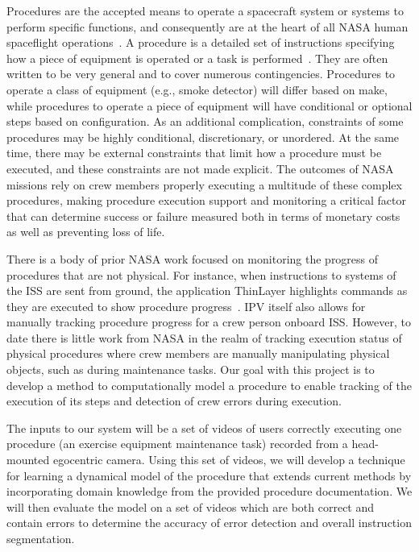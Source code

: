 \documentclass[10pt,letterpaper]{article}
\begin{document}
Procedures are the accepted means to operate a spacecraft system or systems to perform specific functions, and consequently are at the heart of all NASA human spaceflight operations~\cite{kortenkamp2008procedure}. A procedure is a detailed set of instructions specifying how a piece of equipment is operated or a task is performed~\cite{frank2010plans}. They are often written to be very general and to cover numerous contingencies. Procedures to operate a class of equipment (e.g., smoke detector) will differ based on make, while procedures to operate a piece of equipment will have conditional or optional steps based on configuration. As an additional complication, constraints of some procedures may be highly conditional, discretionary, or unordered. At the same time, there may be external constraints that limit how a procedure must be executed, and these constraints are not made explicit. The outcomes of NASA missions rely on crew members properly executing a multitude of these complex procedures, making procedure execution support and monitoring a critical factor that can determine success or failure measured both in terms of monetary costs as well as preventing loss of life.

There is a body of prior NASA work focused on monitoring the progress of procedures that are not physical. For instance, when instructions to systems of the ISS are sent from ground, the application ThinLayer highlights commands as they are executed to show procedure progress~\cite{frank2010plans}. IPV itself also allows for manually tracking procedure progress for a crew person onboard ISS. However, to date there is little work from NASA in the realm of tracking execution status of physical procedures where crew members are manually manipulating physical objects, such as during maintenance tasks. Our goal with this project is to develop a method to computationally model a procedure to enable tracking of the execution of its steps and detection of crew errors during execution.

The inputs to our system will be a set of videos of users correctly executing one procedure (an exercise equipment maintenance task) recorded from a head-mounted egocentric camera. Using this set of videos, we will develop a technique for learning a dynamical model of the procedure that extends current methods by incorporating domain knowledge from the provided procedure documentation. We will then evaluate the model on a set of videos which are both correct and contain errors to determine the accuracy of error detection and overall instruction segmentation.
\end{document}
